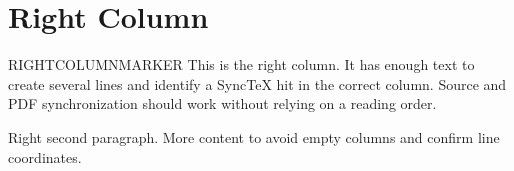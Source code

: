 \section*{Right Column}
RIGHTCOLUMNMARKER This is the right column. It has enough text to create several lines and identify a SyncTeX hit in the correct column. Source and PDF synchronization should work without relying on a reading order.

Right second paragraph. More content to avoid empty columns and confirm line coordinates.